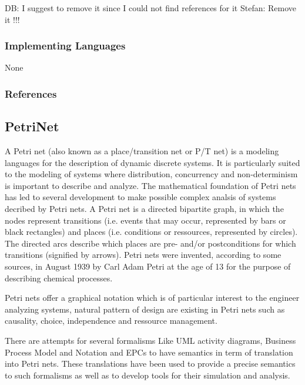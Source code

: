 DB: I suggest to remove it since I could not find references for it
Stefan: Remove it !!!


\subsubsection{Implementing Languages}

None


\subsubsection{References}





\subsection{PetriNet}
\label{subsecF:PetriNet}

\label{subsecL:PetriNetLanguage}

A Petri net (also known as a place/transition net or P/T net) is a modeling languages for the description of dynamic discrete systems. It is particularly suited to the modeling of systems where distribution, concurrency and non-determinism is important to describe and analyze. The mathematical foundation of Petri nets has led to several development to make possible complex analsis of systems decribed by Petri nets. A Petri net is a directed bipartite graph, in which the nodes represent transitions (i.e. events that may occur, represented by bars or black rectangles) and places (i.e. conditions or ressources, represented by circles). The directed arcs describe which places are pre- and/or postconditions for which transitions (signified by arrows).  Petri nets were invented, according to some sources, in August 1939 by Carl Adam Petri at the age of 13 for the purpose of describing chemical processes.

Petri nets offer a graphical notation which is of particular interest to the engineer analyzing systems, natural pattern of design are existing in Petri nets such as causality, choice, independence and ressource management.

There are attempts for several formalisms Like UML activity diagrams, Business Process Model and Notation and EPCs to have semantics in term of translation into Petri nets. These translations have been used to provide a precise semantics to such formalisms as well as to  develop tools for their simulation and analysis.

